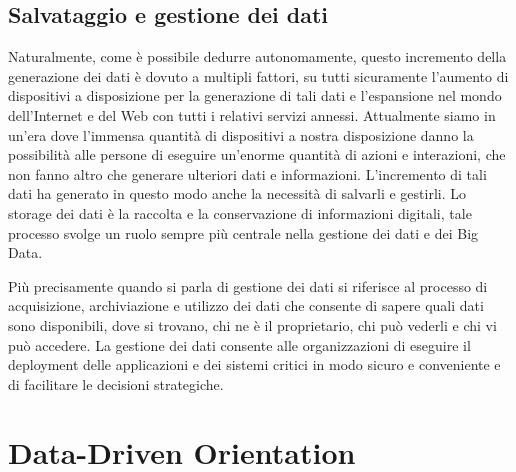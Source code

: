 \subsection{Salvataggio e gestione dei dati}

Naturalmente, come è possibile dedurre autonomamente, questo incremento della generazione dei dati è dovuto a multipli fattori, su tutti sicuramente l'aumento di dispositivi a disposizione per la generazione di tali dati e l'espansione nel mondo dell'Internet e del Web con tutti i relativi servizi annessi. Attualmente siamo in un'era dove l'immensa quantità di dispositivi a nostra disposizione danno la possibilità alle persone di eseguire un'enorme quantità di azioni e interazioni, che non fanno altro che generare ulteriori dati e informazioni. L'incremento di tali dati ha generato in questo modo anche la necessità di salvarli e gestirli. Lo storage dei dati è la raccolta e la conservazione di informazioni digitali, tale processo svolge un ruolo sempre più centrale nella gestione dei dati e dei Big Data.~\cite{redhat_data_storage}

Più precisamente quando si parla di gestione dei dati si riferisce al processo di acquisizione, archiviazione e utilizzo dei dati che consente di sapere quali dati sono disponibili, dove si trovano, chi ne è il proprietario, chi può vederli e chi vi può accedere. La gestione dei dati consente alle organizzazioni di eseguire il deployment delle applicazioni e dei sistemi critici in modo sicuro e conveniente e di facilitare le decisioni strategiche.~\cite{redhat_data_management}

\section{Data-Driven Orientation}

